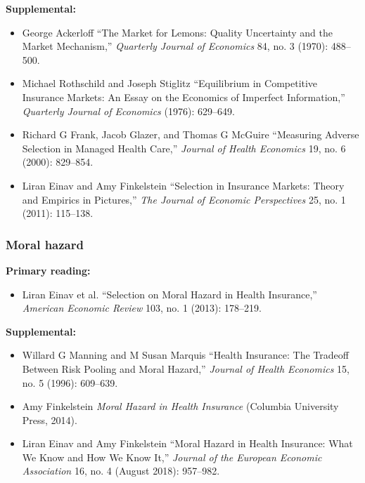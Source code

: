 \documentclass[11pt,]{article}
\providecommand{\tightlist}{%
  \setlength{\itemsep}{0pt}\setlength{\parskip}{0pt}}
\begin{document}
\textbf{Supplemental:}

\begin{itemize}
\tightlist
\item
  George Ackerloff {``The Market for Lemons: {Quality} Uncertainty and
  the Market Mechanism,''} \emph{Quarterly Journal of Economics} 84, no.
  3 (1970): 488--500.
\item
  Michael Rothschild and Joseph Stiglitz {``Equilibrium in Competitive
  Insurance Markets: {An} Essay on the Economics of Imperfect
  Information,''} \emph{Quarterly Journal of Economics} (1976):
  629--649.
\item
  Richard G Frank, Jacob Glazer, and Thomas G McGuire {``Measuring
  Adverse Selection in Managed Health Care,''} \emph{Journal of Health
  Economics} 19, no. 6 (2000): 829--854.
\item
  Liran Einav and Amy Finkelstein {``Selection in {Insurance} {Markets}:
  {Theory} and {Empirics} in {Pictures},''} \emph{The Journal of
  Economic Perspectives} 25, no. 1 (2011): 115--138.
\end{itemize}

\hypertarget{moral-hazard}{%
\subsubsection{Moral hazard}\label{moral-hazard}}

\textbf{Primary reading:}

\begin{itemize}
\tightlist
\item
  Liran Einav et al. {``Selection on Moral Hazard in Health
  Insurance,''} \emph{American Economic Review} 103, no. 1 (2013):
  178--219.
\end{itemize}

\textbf{Supplemental:}

\begin{itemize}
\tightlist
\item
  Willard G Manning and M Susan Marquis {``Health Insurance: The
  Tradeoff Between Risk Pooling and Moral Hazard,''} \emph{Journal of
  Health Economics} 15, no. 5 (1996): 609--639.
\item
  Amy Finkelstein \emph{Moral Hazard in Health Insurance} (Columbia
  University Press, 2014).
\item
  Liran Einav and Amy Finkelstein {``Moral {Hazard} in {Health}
  {Insurance}: {What} {We} {Know} and {How} {We} {Know} {It},''}
  \emph{Journal of the European Economic Association} 16, no. 4 (August
  2018): 957--982.
\end{itemize}
\end{document}
